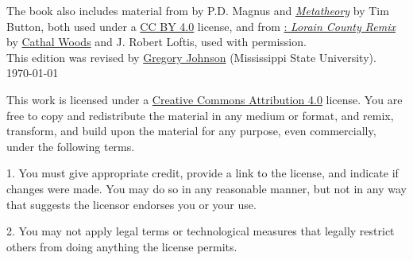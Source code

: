 \noindent The book also includes material from \forallx{} by P.D. Magnus 
and \href{http://www.homepages.ucl.ac.uk/~uctytbu/OERs.html}{\emph{Metatheory}} by Tim Button, 
both used under a \href{https://creativecommons.org/licenses/by/4.0/}{CC BY 4.0} license, 
and from \href{https://github.com/rob-helpy-chalk/openintroduction}{\forallx: \emph{Lorain County Remix}} by \href{https://sites.google.com/site/cathalwoods/}{Cathal Woods} and J. Robert Loftis, used with permission.\\[1ex]

\noindent This edition was revised by \href{http://loighic.net/}{Gregory Johnson} (Mississippi State University).\\[1ex]
\indent \today

\bigskip
\bigskip

\noindent \footnotesize This work is licensed under a \href{https://creativecommons.org/licenses/by/4.0/}{Creative Commons Attribution 4.0} license. 
You are free to copy and redistribute the material in any medium or format, and  remix, transform, and build upon the material for any purpose, even commercially, under the following terms.
\begin{earg}
\item[1.] You must give appropriate credit, provide a link to the license, and indicate if changes were made. You may do so in any reasonable manner, but not in any way that suggests the licensor endorses you or your use.
\item[2.] You may not apply legal terms or technological measures that legally restrict others from doing anything the license permits.
\end{earg}



\normalsize 
